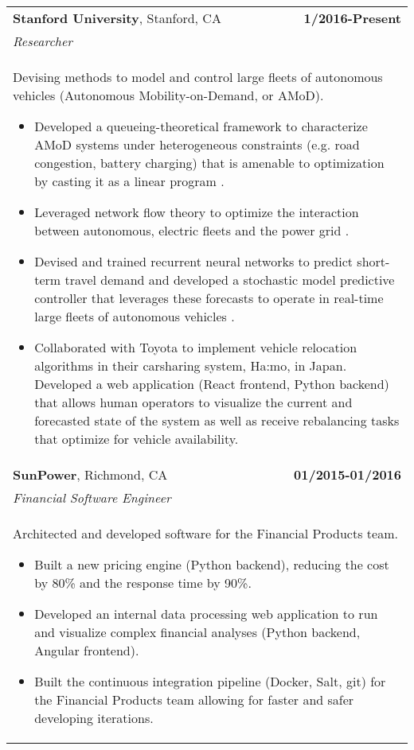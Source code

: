 \documentclass[a4paper,10pt]{article}
\begin{document}
\begin{tabularx}{\textwidth}{Xr}
 {\bf{Stanford University}}, Stanford, CA & \bf{1/2016-Present}\\
 \emph{Researcher} &\\
 \multicolumn{2}{p{0.98\textwidth}}{
 Devising methods to model and control large fleets of autonomous vehicles (Autonomous Mobility-on-Demand, or AMoD). 
 \begin{itemize}
 	\item Developed a queueing-theoretical framework to characterize AMoD systems under heterogeneous constraints (e.g. road congestion, battery charging) that is amenable to optimization by casting it as a linear program \cite{IglesiasRossiEtAl2016,IglesiasRossiEtAl2017}.
 	\item Leveraged network flow theory to optimize the interaction between autonomous, electric fleets and the power grid \cite{RossiIglesiasEtAl2018,RossiIglesiasEtAl2018b}.
 	\item Devised and trained recurrent neural networks to predict short-term travel demand and developed a stochastic model predictive controller that leverages these forecasts to operate in real-time large fleets of autonomous vehicles \cite{IglesiasRossiEtAl2018,TsaoIglesiasEtAl}.
 	\item Collaborated with Toyota to implement vehicle relocation algorithms in their carsharing system, Ha:mo, in Japan. Developed a web application (React frontend, Python backend) that allows human operators to visualize the current and forecasted state of the system as well as receive rebalancing tasks that optimize for vehicle availability.
 \end{itemize}
 }\\

{\bf{SunPower}}, Richmond, CA & \bf{01/2015-01/2016}\\
\emph{Financial Software Engineer} &\\
\multicolumn{2}{p{0.98\textwidth}}{
Architected and developed software for the Financial Products team. 
\begin{itemize}
	\item Built a new pricing engine (Python backend), reducing the cost by 80\% and the response time by 90\%.
	\item Developed an internal data processing web application to run and visualize complex financial analyses (Python backend, Angular frontend).
	\item Built the continuous integration pipeline (Docker, Salt, git) for the Financial Products team allowing for faster and safer developing iterations.
\end{itemize}
}\\


\end{tabularx}
\end{document}

